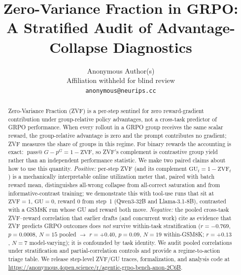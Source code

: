 \documentclass{article}
\title{Zero-Variance Fraction in GRPO: A Stratified Audit of Advantage-Collapse Diagnostics}
\author{Anonymous Author(s)\\
  Affiliation withheld for blind review\\
  \texttt{anonymous@neurips.cc}}
\begin{document}
\sloppy
{}
\hfuzz=2pt

\maketitle

\begin{abstract}
Zero-Variance Fraction (ZVF) is a per-step sentinel for zero reward-gradient
contribution under group-relative policy advantages, not a cross-task
predictor of GRPO performance. When every rollout in a GRPO group receives
the same scalar reward, the group-relative advantage is zero and the prompt
contributes no gradient; ZVF measures the share of groups in this regime. For
binary rewards the accounting is exact:
$\operatorname{pass@}G-p^G=1-\mathrm{ZVF}$, so ZVF's complement is
contrastive group yield rather than an independent performance statistic.
We make two paired claims about how to use this quantity. \emph{Positive:}
per-step ZVF (and its complement $\mathrm{GU}_t = 1-\mathrm{ZVF}_t$) is a
mechanically interpretable online utilization meter that, paired with batch
reward mean, distinguishes all-wrong collapse from all-correct saturation
and from informative-contrast training; we demonstrate this with tool-use
runs that sit at $\mathrm{ZVF}{=}1$, $\mathrm{GU}{=}0$, reward $0$ from
step~1 (Qwen3-32B and Llama-3.1-8B), contrasted with a GSM8K run whose
GU and reward both move. \emph{Negative:} the pooled cross-task ZVF--reward
correlation that earlier drafts (and concurrent work) cite as evidence that
ZVF predicts GRPO outcomes does \emph{not} survive within-task
stratification ($r{=}-0.769$, $p{=}0.0008$, $N{=}15$ pooled $\to$ $r{=}+0.40$,
$p{=}0.09$, $N{=}19$ within-GSM8K; $r{=}+0.13$, $N{=}7$ model-varying); it is
confounded by task identity. We audit pooled correlations under stratification
and partial-correlation controls and provide a regime-to-action triage table.
We release step-level ZVF/GU traces, formalization, and analysis code at
\url{https://anonymous.4open.science/r/agentic-grpo-bench-anon-2C6B}.
\end{abstract}
 
\end{document}
